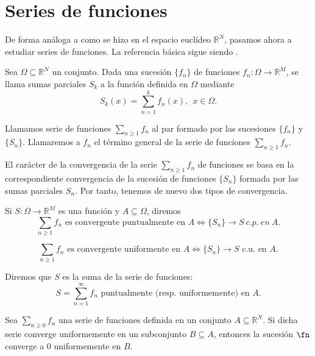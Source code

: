 \newpage



\section{Series de funciones}

De forma análoga a como se hizo en el espacio euclídeo $\mathbb{R}^N$, pasamos ahora a estudiar series de funciones. La referencia básica sigue siendo \cite[Capítulo 5]{marsden}.

\begin{ndef}
  Sea $\Omega\subseteq \mathbb R^N$ un conjunto.
  Dada una sucesi\'on $\{f_n \}$ de funciones $f_n : \Omega \longrightarrow \mathbb R^M$, se llama sumas parciales $S_k$ a la funci\'on definida en $\Omega$ mediante
  \[
    S_k (x) = \sum_{n=1}^{k} f_n(x),\ \ x\in\Omega.
  \]
\end{ndef}

\begin{ndef}
  Llamamos serie  de funciones $\sum_{n\geq 1} f_n$ al par formado por las sucesiones  $\{ f_n \}$ y $\{S_n\}$. Llamaremos a $f_n$ el t\'ermino general de la serie de funciones $\displaystyle\sum_{n\geq 1} f_n$.
\end{ndef}


El car\'acter de la convergencia de la serie $\sum_{n\geq 1} f_n$ de funciones se basa en la correspondiente convergencia de la sucesi\'on de funciones $\{S_n\}$ formada por las sumas parciales $S_n$. Por tanto, tenemos de nuevo dos tipos de convergencia.
\begin{ndef}
  Si $S:\Omega\longrightarrow \mathbb R^M$ es una funci\'on y $A\subseteq \Omega$, diremos
  $$\sum_{n\geq 1} f_n  \mbox{ es convergente puntualmente en } A \Leftrightarrow \{S_n \} \longrightarrow S\ c.p.\ en\ A.$$

  $$\sum_{n\geq 1} f_n  \mbox{ es convergente uniformente en }A \Leftrightarrow \{S_n \} \longrightarrow S \mbox{ c.u. en }A.$$

  Diremos que $S$ es la suma de la serie de funciones:
  \[
    S=\displaystyle \sum_{n=1}^{\infty} f_n \mbox{ puntualmente (resp. uniformemente) en $A$.}
  \]
\end{ndef}

\begin{nprop}
  Sea $\sum_{n \ge 0} f_n$ una serie de funciones definida en un conjunto $A \subseteq \mathbb{R}^N$. Si dicha serie converge uniformemente en un subconjunto $B \subseteq A$, entonces la sucesión $\fn$ converge a 0 uniformemente en $B$.
\end{nprop}

